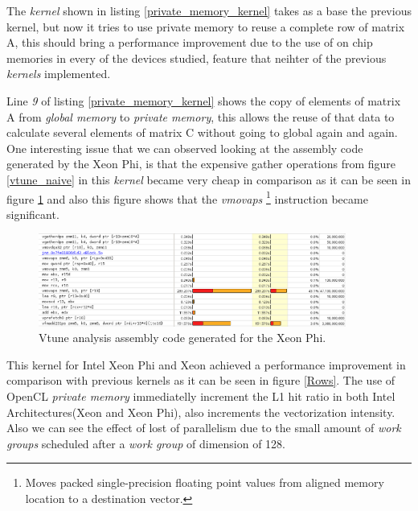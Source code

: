 \par{The \emph{kernel} shown in listing \ref{private_memory_kernel} takes as a base the previous kernel, 
    but now it tries to use private memory to reuse a complete row of matrix A, this should bring a performance improvement
    due to the use of on chip memories in every of the devices studied, feature that neihter of the previous \emph{kernels}
    implemented.}



\par{Line \emph{9} of listing \ref{private_memory_kernel} shows the copy of elements of matrix A from \emph{global memory} to
    \emph{private memory}, this allows the reuse of that data to calculate several elements of matrix C without going to global
    again and again. One interesting issue that we can observed looking at the assembly code generated by the Xeon Phi, is that the 
    expensive gather operations from figure \ref{vtune_naive} in this \emph{kernel} became very cheap in comparison as it can
    be seen in figure \ref{vtune_rows} and also this figure shows that the \emph{vmovaps} \footnote{Moves packed single-precision 
    floating point values from aligned memory location to a destination vector\cite{intrinsics}.} 
    instruction became significant.}

\begin{figure}[!h]
    \centering
    \includegraphics[width=0.9\textwidth]{figures/vtune_rows.png}
    \caption{Vtune analysis assembly code generated for the Xeon Phi.}
    \label{vtune_rows}
\end{figure}


\par{This kernel for Intel Xeon Phi and Xeon achieved a performance improvement in comparison with previous kernels as it can 
    be seen in figure \ref{Rows}. The use of OpenCL \emph{private memory} immediatelly increment the L1 hit ratio in both Intel
    Architectures(Xeon and Xeon Phi), also increments the vectorization intensity. Also we can see the effect of lost of parallelism
    due to the small amount of \emph{work groups} scheduled after a \emph{work group} of dimension of 128.}

